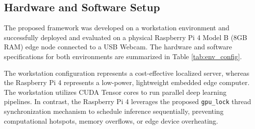 \documentclass[12pt,a4paper]{article}
\begin{document}
\subsection{Hardware and Software Setup}
The proposed framework was developed on a workstation environment and successfully deployed and evaluated on a physical Raspberry Pi 4 Model B (8GB RAM) edge node connected to a USB Webcam. The hardware and software specifications for both environments are summarized in Table \ref{tab:env_config}.

\begin{table}[h]
    \centering
    \caption{Hardware and Software Environment Configuration}
    \label{tab:env_config}
\end{table}

The workstation configuration represents a cost-effective localized server, whereas the Raspberry Pi 4 represents a low-power, lightweight embedded edge computer. The workstation utilizes CUDA Tensor cores to run parallel deep learning pipelines. In contrast, the Raspberry Pi 4 leverages the proposed \texttt{gpu\_lock} thread synchronization mechanism to schedule inference sequentially, preventing computational hotspots, memory overflows, or edge device overheating.
\end{document}
